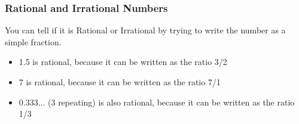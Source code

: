 \documentclass{beamer}
\begin{document}
\begin{frame}
\frametitle{Rational and Irrational Numbers}
You can tell if it is Rational or Irrational by trying to write the number as a simple fraction.
\begin{itemize}
\item  1.5 is rational, because it can be written as the ratio 3/2
\item  7 is rational, because it can be written as the ratio 7/1
\item  0.333... (3 repeating) is also rational, because it can be written as the ratio 1/3
\end{itemize}
\end{frame}
\end{document}
